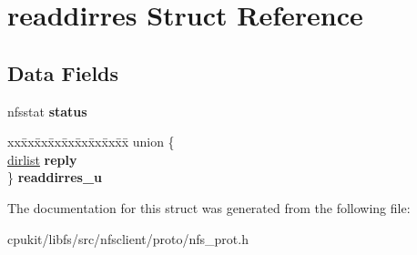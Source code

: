 \hypertarget{structreaddirres}{}\section{readdirres Struct Reference}
\label{structreaddirres}
\subsection*{Data Fields}
\begin{DoxyCompactItemize}
\item 
\mbox{\label{structreaddirres_ac2a4704885b5362e1c9128c414174685}} 
nfsstat {\bfseries status}
\item 
\mbox{\label{structreaddirres_ac1b9b3768a16f665a776a0b3b0517547}} 
\begin{tabbing}
xx\=xx\=xx\=xx\=xx\=xx\=xx\=xx\=xx\=\kill
union \{\\
\>\mbox{\hyperlink{structdirlist}{dirlist}} {\bfseries reply}\\
\} {\bfseries readdirres\_u}\\

\end{tabbing}\end{DoxyCompactItemize}


The documentation for this struct was generated from the following file\+:\begin{DoxyCompactItemize}
\item 
cpukit/libfs/src/nfsclient/proto/nfs\+\_\+prot.\+h\end{DoxyCompactItemize}
